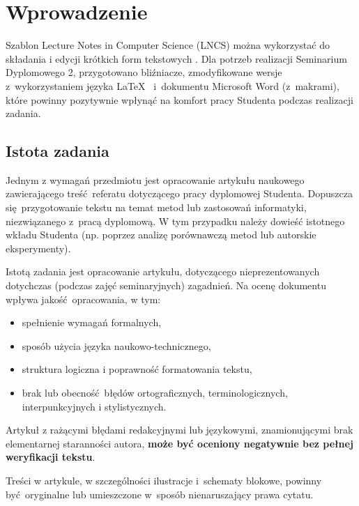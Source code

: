 \section{Wprowadzenie}
\label{sec:intro}

Szablon Lecture Notes in Computer Science (LNCS) można wykorzystać do składania i edycji krótkich form tekstowych \cite{ref:lncs}. Dla potrzeb realizacji Seminarium Dyplomowego 2, przygotowano bliźniacze, zmodyfikowane wersje z~wykorzystaniem języka \LaTeX~\cite{ref:latex} i~dokumentu Microsoft Word (z~makrami), które powinny pozytywnie wpłynąć na komfort pracy Studenta podczas realizacji zadania.

\subsection{Istota zadania}
\label{subsec:essence}

Jednym z wymagań przedmiotu jest opracowanie artykułu naukowego zawierającego treść referatu dotyczącego pracy dyplomowej Studenta. Dopuszcza się przygotowanie tekstu na temat metod lub zastosowań informatyki, niezwiązanego z~pracą dyplomową. W tym przypadku należy dowieść istotnego wkładu Studenta (np. poprzez analizę porównawczą metod lub autorskie eksperymenty).

Istotą zadania jest opracowanie artykułu, dotyczącego nieprezentowanych dotychczas (podczas zajęć seminaryjnych) zagadnień. Na ocenę dokumentu wpływa jakość opracowania, w tym:

\begin{itemize}[noitemsep]
	\item spełnienie wymagań formalnych,
	\item sposób użycia języka naukowo-technicznego,
	\item struktura logiczna i poprawność formatowania tekstu,
	\item brak lub obecność błędów ortograficznych, terminologicznych, interpunkcyjnych i stylistycznych.
\end{itemize}

\begin{note}
	Artykuł z rażącymi błędami redakcyjnymi lub językowymi, znamionującymi brak elementarnej staranności autora, \textbf{może być oceniony negatywnie bez pełnej weryfikacji tekstu}.
\end{note}

\begin{note}
	Treści w artykule, w szczególności ilustracje i~schematy blokowe, powinny być oryginalne lub umieszczone w~sposób nienaruszający prawa cytatu.
\end{note}

